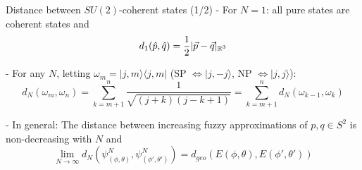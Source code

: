 \begin{frame}{Distance between $SU(2)$-coherent states (1/2)} %
- For $N = 1$: all pure states are coherent states and 
\begin{equation}
    d_1(\hat p, \hat q) = \frac{1}{2}|\vec p - \vec q|_{\mathbb R^3}
\end{equation}

- For any $N$, letting $\omega_m = |j, m\rangle \langle j, m|$ (SP $\Longleftrightarrow |j, -j\rangle$, NP $\Longleftrightarrow |j, j\rangle$):
\begin{equation}
    d_N(\omega_m, \omega_n) = \sum_{k = m+1}^n \frac{1}{\sqrt{(j+k)(j-k+1)}} = \sum_{k = m+1}^n d_N(\omega_{k-1}, \omega_k)
\end{equation}

- In general:
    The distance between increasing fuzzy approximations of $p, q \in S^2$ is non-decreasing with $N$ and
    \begin{equation}
        \lim_{N \to \infty} d_N(\psi^N_{(\phi, \theta)}, \psi^N_{(\phi', \theta')}) = d_{geo}(E(\phi, \theta), E(\phi', \theta'))
    \end{equation}
\end{frame}








